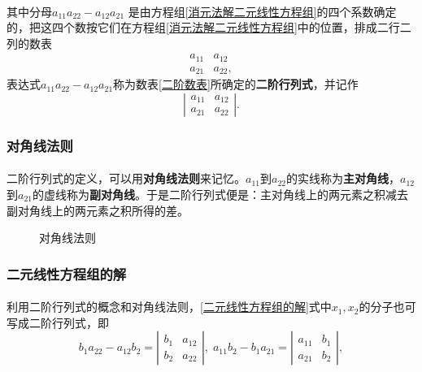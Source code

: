 \paragraph{}
其中分母$a_{11}a_{22} - a_{12}a_{21}$ 是由方程组\eqref{消元法解二元线性方程组}的四个系数确定的，把这四个数按它们在方程组\eqref{消元法解二元线性方程组}中的位置，排成二行二列的数表
\begin{equation}
\label{二阶数表}
\begin{array}{cc}
a_{11} & a_{12} \\ a_{21} & a_{22},
\end{array}
\end{equation}
表达式$a_{11}a_{22} - a_{12}a_{21}$称为数表\eqref{二阶数表}所确定的\textbf{二阶行列式}，并记作
\begin{equation}
  \left|
  \begin{array}{cc}
  a_{11} & a_{12} \\ a_{21} & a_{22}
  \end{array} \right|.
\end{equation}

\subsubsection{对角线法则}
\paragraph{}
二阶行列式的定义，可以用\textbf{对角线法则}来记忆。$a_{11}$到$a_{22}$的实线称为\textbf{主对角线}，$a_{12}$到$a_{21}$的虚线称为\textbf{副对角线}。于是二阶行列式便是：主对角线上的两元素之积减去副对角线上的两元素之积所得的差。
\begin{figure}[H]
\centering
  
  \caption{对角线法则}
  \label{图:二阶对角线法则}
\end{figure}

\subsubsection{二元线性方程组的解}
\paragraph{}
利用二阶行列式的概念和对角线法则，\eqref{二元线性方程组的解}式中$x_1,x_2$的分子也可写成二阶行列式，即
\begin{equation*}
  b_1a_{22} - a_{12}b_2 = \left|\begin{array}{cc} b_1 & a_{12} \\ b_2 & a_{22}\end{array}\right|, \;
  a_{11}b_2 - b_1a_{21} = \left|\begin{array}{cc} a_{11} & b_1 \\ a_{21} & b_2\end{array}\right|,
\end{equation*}

